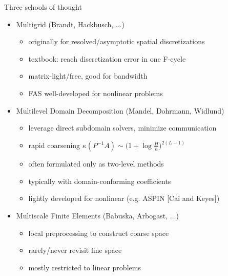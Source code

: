 \begin{frame}{Three schools of thought}
  \begin{itemize}
  \item Multigrid (Brandt, Hackbusch, $\dotsc$)
    \begin{itemize}
    \item originally for resolved/asymptotic spatial discretizations
    \item textbook: reach discretization error in one F-cycle
    \item matrix-light/free, good for bandwidth
    \item FAS well-developed for nonlinear problems
    \end{itemize}
  \item Multilevel Domain Decomposition (Mandel, Dohrmann, Widlund)
    \begin{itemize}
    \item leverage direct subdomain solvers, minimize communication
    \item rapid coarsening $\kappa(P^{-1}A) \sim \big(1 + \log \frac H h \big)^{2(L-1)}$
    \item often formulated only as two-level methods
    \item typically with domain-conforming coefficients
    \item lightly developed for nonlinear (e.g. ASPIN [Cai and Keyes])
    \end{itemize}
  \item Multiscale Finite Elements (Babuska, Arbogast, $\dotsc$)
    \begin{itemize}
    \item local preprocessing to construct coarse space
    \item rarely/never revisit fine space
    \item mostly restricted to linear problems
    \end{itemize}
  \end{itemize}
\end{frame}
